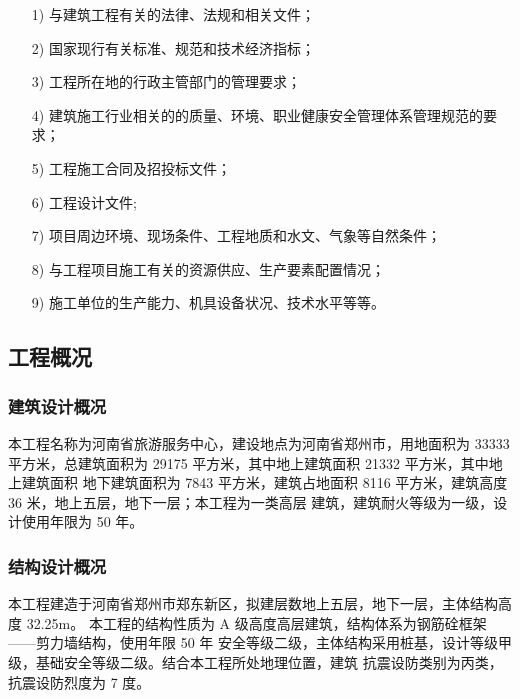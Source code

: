 \begin{itemize}

    \item [1)] 与建筑工程有关的法律、法规和相关文件；

    \item [2)] 国家现行有关标准、规范和技术经济指标；

    \item [3)] 工程所在地的行政主管部门的管理要求；

    \item [4)] 建筑施工行业相关的的质量、环境、职业健康安全管理体系管理规范的要求；

    \item [5)] 工程施工合同及招投标文件；

    \item [6)] 工程设计文件;

    \item [7)] 项目周边环境、现场条件、工程地质和水文、气象等自然条件；

    \item [8)] 与工程项目施工有关的资源供应、生产要素配置情况；

    \item [9)] 施工单位的生产能力、机具设备状况、技术水平等等。
    
\end{itemize}

\subsection{工程概况}
\subsubsection{建筑设计概况}

本工程名称为河南省旅游服务中心，建设地点为河南省郑州市，用地面积为 33333 平方米，总建筑面积为 29175 平方米，其中地上建筑面积 21332 平方米，其中地上建筑面积
地下建筑面积为 7843 平方米，建筑占地面积 8116 平方米，建筑高度 36 米，地上五层，地下一层；本工程为一类高层
建筑，建筑耐火等级为一级，设计使用年限为 50 年。

\subsubsection{结构设计概况}

本工程建造于河南省郑州市郑东新区，拟建层数地上五层，地下一层，主体结构高度 32.25m。
本工程的结构性质为 A 级高度高层建筑，结构体系为钢筋硂框架——剪力墙结构，使用年限 50 年
安全等级二级，主体结构采用桩基，设计等级甲级，基础安全等级二级。结合本工程所处地理位置，建筑
抗震设防类别为丙类，抗震设防烈度为 7 度。

